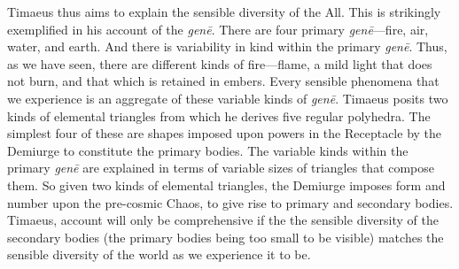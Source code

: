 Timaeus thus aims to explain the sensible diversity of the All. This is strikingly exemplified in his account of the \emph{genē}. There are four primary \emph{genē}---fire, air, water, and earth. And there is variability in kind within the primary \emph{genē}. Thus, as we have seen, there are different kinds of fire---flame, a mild light that does not burn, and that which is retained in embers. Every sensible phenomena that we experience is an aggregate of these variable kinds of \emph{genē}. Timaeus posits two kinds of elemental triangles from which he derives five regular polyhedra. The simplest four of these are shapes imposed upon powers in the Receptacle by the Demiurge to constitute the primary bodies. The variable kinds within the primary \emph{genē} are explained in terms of variable sizes of triangles that compose them. So given two kinds of elemental triangles, the Demiurge imposes form and number upon the pre-cosmic Chaos, to give rise to primary and secondary bodies. Timaeus, account will only be comprehensive if the the sensible diversity of the secondary bodies (the primary bodies being too small to be visible) matches the sensible diversity of the world as we experience it to be.

